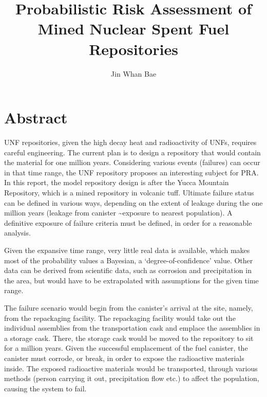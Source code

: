\documentclass[12pt]{article}
\title{Probabilistic Risk Assessment of Mined Nuclear Spent Fuel Repositories }
\author{Jin Whan Bae}
\affil{Dept. of Nuclear, Plasma, and Radiological Engineering, University of Illinois at Urbana-Champaign
		  Urbana, IL}
\date{}                     %
\begin{document}
\maketitle

\section{Abstract}
\gls{UNF} repositories, given the high decay heat and radioactivity
of \glspl{UNF}, requires careful engineering. The current plan is
to design a repository that would contain the material for one million years.
Considering various events (failures) can occur in that time range,
the \gls{UNF} repository proposes an interesting subject for
\gls{PRA}. In this report, the model repository design is after the 
Yucca Mountain Repository, which is a mined repository in volcanic tuff.
Ultimate failure status can be defined in various ways, depending on the
extent of leakage during the one million years (leakage from canister
\textasciitilde exposure to nearest population).
A definitive exposure of failure criteria must be defined,
in order for a reasonable analysis.  

Given the expansive
time range, very little real data is available, which makes
most of the probability values a Bayesian, a `degree-of-confidence' value.
Other data can be derived from scientific data, such as 
corrosion and precipitation in the area, but would have to be extrapolated
with assumptions for the given time range.

The failure scenario would begin from the canister's arrival at the
site, namely, from the repackaging facility. The repackaging facility
would take out the individual assemblies from the transportation cask
and emplace the assemblies in a storage cask. There, the storage cask
would be moved to the repository to sit for a million years. 
Given the successful emplacement of the fuel canister, the canister
must corrode, or break, in order to expose the radioactive materials
inside. The exposed radioactive materials would be transported, through
various methods (person carrying it out, precipitation flow etc.)
to affect the population, causing the system to fail.



%
%
\end{document}
